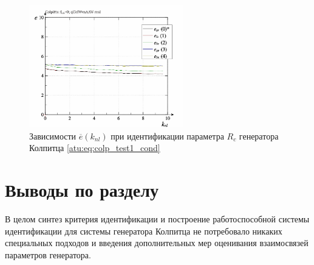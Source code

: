 \begin{figure}[htb!]
  \centerline{\includegraphics[width=0.6\textwidth]{p/r/colp_real_id-p_k_nl_d_0.png} }
  \caption{Зависимости $\overline{e}(k_{nl})$ при идентификации параметра $R_c$ генератора Колпитца \ref{atu:eq:colp_test1_cond} }
  \label{atu:f:colp_real_id_p_k_nl_d_0.png}
\end{figure}
%
%



\section{Выводы по разделу \thechapter}  %


В целом синтез критерия идентификации и построение работоспособной системы идентификации для
системы генератора Колпитца не потребовало никаких специальных подходов и введения дополнительных
мер оценивания взаимосвязей параметров генератора.


